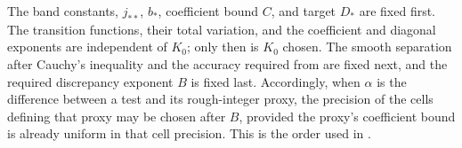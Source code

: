 \begin{remark}\label{rem:typeii-order}
The band constants, $j_{**}$, $b_*$, coefficient bound $C$, and target
$D_*$ are fixed first. The transition functions, their total variation,
and the coefficient and diagonal exponents are independent of $K_0$;
only then is $K_0$ chosen. The smooth separation after Cauchy's
inequality and the accuracy required from  are fixed
next, and the required discrepancy exponent $B$ is fixed last.
Accordingly, when $\alpha$ is the difference between a test and its
rough-integer proxy, the precision of the cells defining that proxy may
be chosen after $B$, provided the proxy's coefficient bound is already
uniform in that cell precision. This is the order used in
.
\end{remark}
